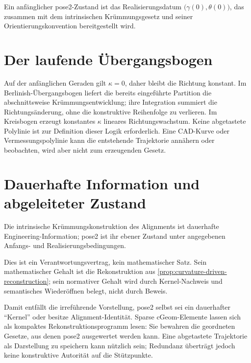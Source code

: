 \begin{definition}
\label{def:initial-pose2}
Ein anfänglicher pose2-Zustand ist das Realisierungsdatum
\(\bigl(\gamma(0),\theta(0)\bigr)\), das zusammen mit dem intrinsischen
Krümmungsgesetz und seiner Orientierungskonvention bereitgestellt wird.
\end{definition}

\section{Der laufende Übergangsbogen}

Auf der anfänglichen Geraden gilt \(\kappa=0\), daher bleibt die Richtung
konstant. Im Berlinish-Übergangsbogen liefert die bereits eingeführte
Partition die abschnittsweise Krümmungsentwicklung; ihre Integration summiert
die Richtungsänderung, ohne die konstruktive Reihenfolge zu verlieren. Im
Kreisbogen erzeugt konstantes \(\kappa\) lineares Richtungswachstum. Keine
abgetastete Polylinie ist zur Definition dieser Logik erforderlich. Eine
CAD-Kurve oder Vermessungspolylinie kann die entstehende Trajektorie annähern
oder beobachten, wird aber nicht zum erzeugenden Gesetz.

\section{Dauerhafte Information und abgeleiteter Zustand}

\begin{principle}
\label{prop:pose2-persistent-kernel}
Die intrinsische Krümmungskonstruktion des Alignments ist dauerhafte
Engineering-Information; pose2 ist ihr ebener Zustand unter angegebenen
Anfangs- und Realisierungsbedingungen.
\end{principle}

Dies ist ein Verantwortungsvertrag, kein mathematischer Satz. Sein
mathematischer Gehalt ist die Rekonstruktion aus
\cref{prop:curvature-driven-reconstruction}; sein normativer Gehalt wird
durch Kernel-Nachweis und semantisches Wiederöffnen belegt, nicht durch
Beweis.

Damit entfällt die irreführende Vorstellung, pose2 selbst sei ein dauerhafter
``Kernel'' oder besitze Alignment-Identität. Sparse
\(\mathrm{cGeom}\)-Elemente lassen sich als kompaktes Rekonstruktionsprogramm
lesen: Sie bewahren die geordneten Gesetze, aus denen pose2 ausgewertet werden
kann. Eine abgetastete Trajektorie als Darstellung zu speichern kann nützlich
sein; Redundanz überträgt jedoch keine konstruktive Autorität auf die
Stützpunkte.

